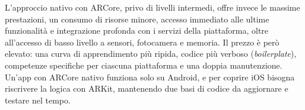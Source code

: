 L'approccio nativo con ARCore, privo di livelli intermedi, offre invece le massime prestazioni, un consumo di risorse minore, accesso immediato alle ultime funzionalità e integrazione profonda con i servizi della piattaforma, oltre all'accesso di basso livello a sensori, fotocamera e memoria. Il prezzo è però elevato: una curva di apprendimento più ripida, codice più verboso (\textit{boilerplate}), competenze specifiche per ciascuna piattaforma e una doppia manutenzione. Un'app con ARCore nativo funziona solo su Android, e per coprire iOS bisogna riscrivere la logica con ARKit, mantenendo due basi di codice da aggiornare e testare nel tempo.